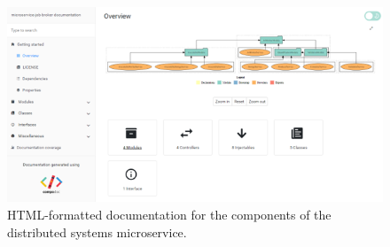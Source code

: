 \begin{landscape}
\begin{figure}
    \centering
    \includegraphics[width=1.3\textwidth]{4_proposed_solution/web_app/figures/html_doc.png}
    \caption{HTML-formatted documentation for the components of the distributed systems microservice.}
    \label{fig:html_doc}
\end{figure}
\end{landscape}